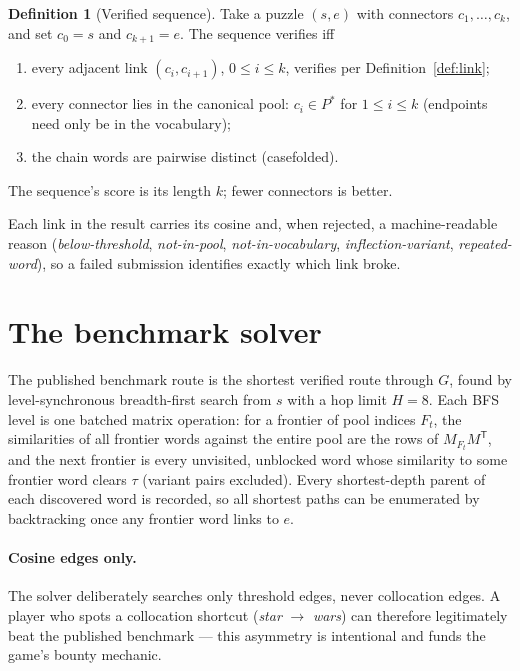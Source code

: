 \documentclass[11pt]{article}
\theoremstyle{definition}
\newtheorem{definition}{Definition}
\newcommand{\thresh}{\tau}
\begin{document}
\begin{definition}[Verified sequence]
Take a puzzle $(s, e)$ with connectors $c_1, \dots, c_k$, and set $c_0 = s$
and $c_{k+1} = e$. The sequence verifies iff
\begin{enumerate}
  \item every adjacent link $(c_i, c_{i+1})$, $0 \le i \le k$, verifies per
        Definition~\ref{def:link};
  \item every connector lies in the canonical pool: $c_i \in P^\ast$ for
        $1 \le i \le k$ (endpoints need only be in the vocabulary);
  \item the chain words are pairwise distinct (casefolded).
\end{enumerate}
The sequence's score is its length $k$; fewer connectors is better.
\end{definition}
Each link in the result carries its cosine and, when rejected, a machine-readable
reason (\emph{below-threshold}, \emph{not-in-pool}, \emph{not-in-vocabulary},
\emph{inflection-variant}, \emph{repeated-word}), so a failed submission
identifies exactly which link broke.

\section{The benchmark solver}
\label{sec:solver}

The published benchmark route is the shortest verified route through $G$,
found by level-synchronous breadth-first search from $s$ with a hop limit
$H = 8$. Each BFS level is one batched matrix operation: for a frontier of
pool indices $F_t$, the similarities of all frontier words against the entire
pool are the rows of $M_{F_t} M^{\mathsf T}$, and the next frontier is every
unvisited, unblocked word whose similarity to some frontier word clears
$\thresh$ (variant pairs excluded). Every shortest-depth parent of each
discovered word is recorded, so all shortest paths can be enumerated by
backtracking once any frontier word links to $e$.

\paragraph{Cosine edges only.}
The solver deliberately searches only threshold edges, never collocation
edges. A player who spots a collocation shortcut (\emph{star} $\to$
\emph{wars}) can therefore legitimately beat the published benchmark --- this
asymmetry is intentional and funds the game's bounty mechanic.
\end{document}
